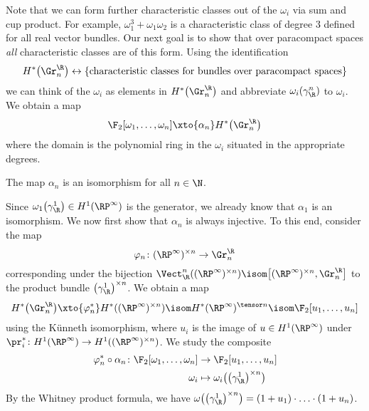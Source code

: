 Note that we can form further characteristic classes out of the $\omega_i$ via sum and cup product.
For example, $\omega_1^3 + \omega_1 \omega_2$ is a characteristic class of degree 3 defined for all real vector bundles.
Our next goal is to show that over paracompact spaces \emph{all} characteristic classes are of this form.
Using the identification 
\begin{equation*}
	H^*\big(\Gr_n^{\R}\big) \leftrightarrow \{\text{characteristic classes for bundles over paracompact spaces}\}
\end{equation*}
we can think of the $\omega_i$ as elements in $H^*\big(\Gr^\R_n\big)$ and abbreviate $\omega_i(\gamma_\R^n)$ to $\omega_i$.
We obtain a map
\begin{equation*}
	\F_2[\omega_1, \ldots, \omega_n] \xto{\alpha_n} H^*\big(\Gr_n^\R\big)
\end{equation*}
where the domain is the polynomial ring in the $\omega_i$ situated in the appropriate degrees.
\begin{theorem}\label{thm:cohomology_gr_R}
	The map $\alpha_n$ is an isomorphism for all $n \in \N$.
\end{theorem}
Since $\omega_1\big(\gamma_\R^1\big) \in H^1(\RP^\infty)$ is the generator, we already know that $\alpha_1$ is an isomorphism.
We now first show that $\alpha_n$ is always injective.
To this end, consider the map
\begin{equation*}
	\varphi_n\colon (\RP^\infty)^{\times n} \to \Gr_n^\R
\end{equation*}
corresponding under the bijection $\Vect_\R^n((\RP^\infty)^{\times n}) \isom \big[(\RP^\infty)^{\times n}, \Gr_n^\R\big]$ to the product bundle $\big(\gamma_\R^1\big)^{\times n}$.
We obtain a map 
\begin{equation*}
	H^*\big(\Gr^\R_n\big) \xto{\varphi_n^*} H^*((\RP^\infty)^{\times n}) \isom H^*(\RP^\infty)^{\tensor n} \isom \F_2[u_1, \ldots, u_n]
\end{equation*}
using the Künneth isomorphism, where $u_i$ is the image of $u \in H^1(\RP^\infty)$ under $\pr_i^*\colon H^1(\RP^\infty) \to H^1((\RP^\infty)^{\times n})$.
We study the composite 
\begin{align*}
	\varphi_n^* \circ \alpha_n\colon \F_2[\omega_1, \ldots, \omega_n] &\to \F_2[u_1, \ldots, u_n] \\
	\omega_i &\mapsto \omega_i\big(\big(\gamma_\R^1\big)^{\times n}\big)
\end{align*}
By the Whitney product formula, we have $\omega\big(\big(\gamma_\R^1\big)^{\times n}\big) = (1 + u_1) \cdot \ldots \cdot (1 + u_n)$.
